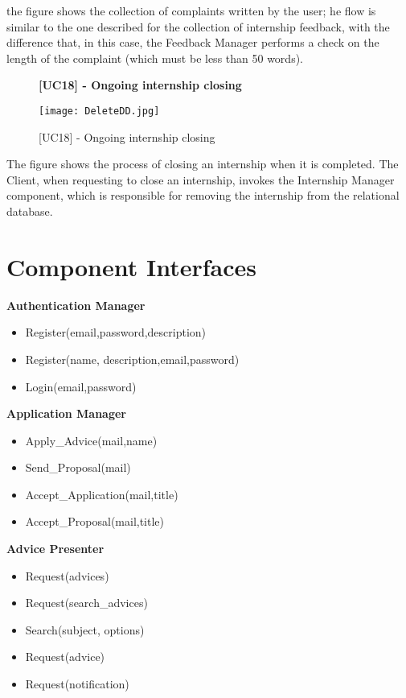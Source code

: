 		the figure shows the collection of complaints written by the user; he flow is similar to the one described for the collection of internship feedback, with the difference that, in this case, the Feedback Manager performs a check on the length of the complaint (which must be less than 50 words).
		
		
		\begin{figure}[H]
			\centering
			{\bfseries [UC18] - Ongoing internship closing}
			\caption{[UC18] - Ongoing internship closing}
			\texttt{[image: DeleteDD.jpg]}
			
		\end{figure}
		
		
		The figure shows the process of closing an internship when it is completed. The Client, when requesting to close an internship, invokes the Internship Manager component, which is responsible for removing the internship from the relational database.
		
		
		
		
	\section{Component Interfaces}
	
	\textbf{Authentication Manager}
	\begin{itemize}
		\item Register(email,password,description)
		\item Register(name, description,email,password)
		\item Login(email,password)
	\end{itemize}
	
	\textbf{Application Manager}
	\begin{itemize}
		\item Apply\_Advice(mail,name)
		\item Send\_Proposal(mail)
		\item Accept\_Application(mail,title)
		\item Accept\_Proposal(mail,title)
	\end{itemize}
	
	\textbf{Advice Presenter}
	\begin{itemize}
		\item Request(advices)
		\item Request(search\_advices)
		\item Search(subject, options)
		\item Request(advice)
		\item Request(notification)
	\end{itemize}
	
